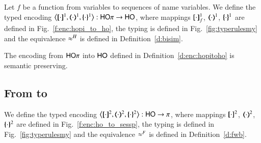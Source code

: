 \begin{definition}
\label{d:enc:hopitoho}
Let $f$ be a function from variables to sequences of name variables.
%
We define the typed encoding $\enco{\map{\cdot}^{1}, \mapt{\cdot}^{1}, \mapa{\cdot}^{1}}: \HOp \to \HO$,
where mappings $[\!\![\cdot]\!\!]^{1}_f$, $(\!\!\langle\cdot\rangle\!\!)^{1}$, $\{\!\!\{\cdot\}\!\!\}^{1}$
are defined in Fig.~\ref{f:enc:hopi_to_ho}, the typing is defined in 
Fig.~\ref{fig:typerulesmy} 
and the equivalence $\approx^H$ is defined in Definition~\ref{d:bisim}.
\end{definition}

\begin{theorem}
\label{f:enc:hopitoho}
The encoding from $\mathsf{HO}\pi$ into $\mathsf{HO}$ defined in Definition~\ref{d:enc:hopitoho}
is semantic preserving. 
\end{theorem}

\subsection{From \HO to \sessp}
\label{subsec:HO_to_sessp}

\begin{definition}
\label{d:enc:hopitopi}
%
We define the typed encoding $\enco{\map{\cdot}^{2}, \mapt{\cdot}^{2}, \mapa{\cdot}^{2}}: \HO \to \sessp$,
where mappings $[\!\![\cdot]\!\!]^{2}$, $(\!\!\langle\cdot\rangle\!\!)^{2}$, $\{\!\!\{\cdot\}\!\!\}^{2}$
are defined in Fig.~\ref{f:enc:ho_to_sessp}, the typing is defined in 
Fig.~\ref{fig:typerulesmy} 
and the equivalence $\approx^F$ is defined in Definition~\ref{d:fwb}.
\end{definition}

